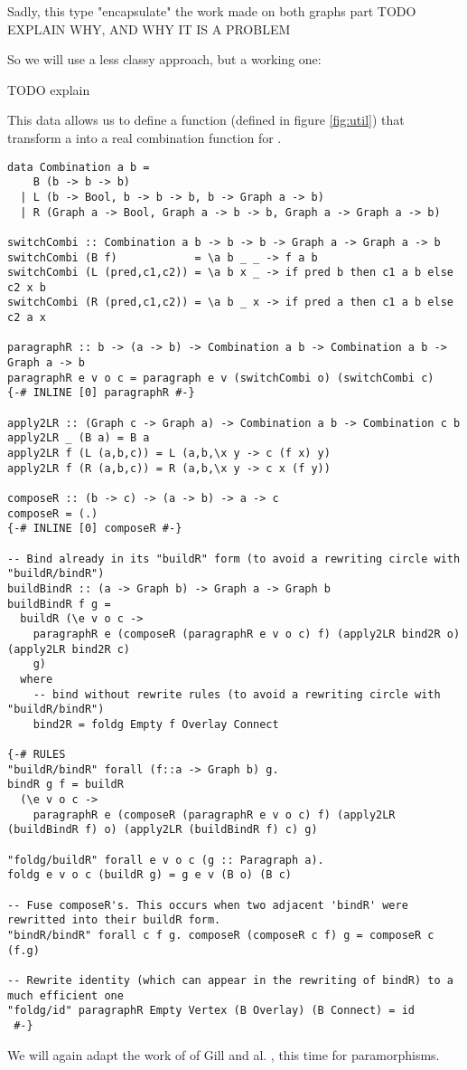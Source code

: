 Sadly, this type "encapsulate" the work made on both graphs part TODO EXPLAIN WHY, AND WHY IT IS A PROBLEM

So we will use a less classy approach, but a working one:

TODO explain

This data allows us to define a function  (defined in figure \ref{fig:util}) that transform a  into a real combination function for .

\begin{figure*}
\begin{verbatim}
data Combination a b =
    B (b -> b -> b)
  | L (b -> Bool, b -> b -> b, b -> Graph a -> b)
  | R (Graph a -> Bool, Graph a -> b -> b, Graph a -> Graph a -> b)

switchCombi :: Combination a b -> b -> b -> Graph a -> Graph a -> b
switchCombi (B f)            = \a b _ _ -> f a b
switchCombi (L (pred,c1,c2)) = \a b x _ -> if pred b then c1 a b else c2 x b
switchCombi (R (pred,c1,c2)) = \a b _ x -> if pred a then c1 a b else c2 a x
  
paragraphR :: b -> (a -> b) -> Combination a b -> Combination a b -> Graph a -> b
paragraphR e v o c = paragraph e v (switchCombi o) (switchCombi c)
{-# INLINE [0] paragraphR #-}

apply2LR :: (Graph c -> Graph a) -> Combination a b -> Combination c b
apply2LR _ (B a) = B a
apply2LR f (L (a,b,c)) = L (a,b,\x y -> c (f x) y)
apply2LR f (R (a,b,c)) = R (a,b,\x y -> c x (f y))

composeR :: (b -> c) -> (a -> b) -> a -> c
composeR = (.)
{-# INLINE [0] composeR #-}

-- Bind already in its "buildR" form (to avoid a rewriting circle with "buildR/bindR")
buildBindR :: (a -> Graph b) -> Graph a -> Graph b
buildBindR f g = 
  buildR (\e v o c -> 
    paragraphR e (composeR (paragraphR e v o c) f) (apply2LR bind2R o) (apply2LR bind2R c) 
    g)
  where
    -- bind without rewrite rules (to avoid a rewriting circle with "buildR/bindR")
    bind2R = foldg Empty f Overlay Connect
    
{-# RULES
"buildR/bindR" forall (f::a -> Graph b) g.
bindR g f = buildR 
  (\e v o c -> 
    paragraphR e (composeR (paragraphR e v o c) f) (apply2LR (buildBindR f) o) (apply2LR (buildBindR f) c) g)

"foldg/buildR" forall e v o c (g :: Paragraph a).
foldg e v o c (buildR g) = g e v (B o) (B c)

-- Fuse composeR's. This occurs when two adjacent 'bindR' were rewritted into their buildR form.
"bindR/bindR" forall c f g. composeR (composeR c f) g = composeR c (f.g)

-- Rewrite identity (which can appear in the rewriting of bindR) to a much efficient one
"foldg/id" paragraphR Empty Vertex (B Overlay) (B Connect) = id
 #-}
\end{verbatim}
\caption{Some utility functions}
\label{fig:util}
\end{figure*}

\label{sec:defor-para}
We will again adapt the work of of Gill and al. \cite{Gill:1993:SCD:165180.165214}, this time for paramorphisms.

